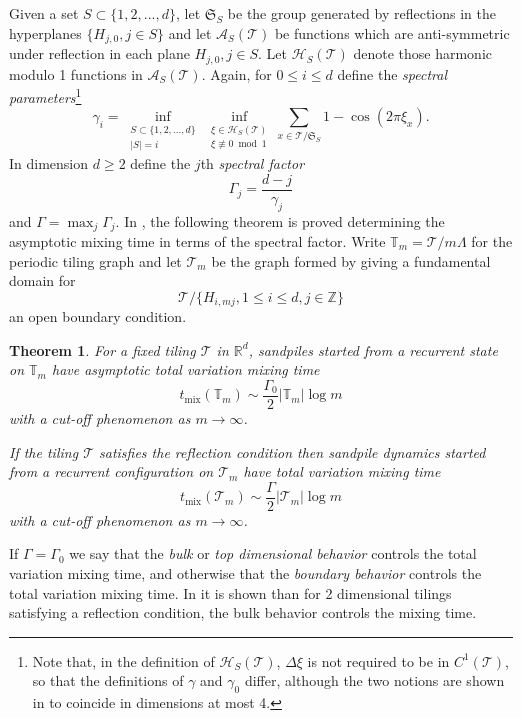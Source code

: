 \documentclass[a4paper, 12pt, notitlepage]{amsart}
\newcommand{\mix}{\operatorname{mix}}
\newcommand{\bR}{\mathbb{R}}
\newcommand{\bT}{\mathbb{T}}
\newcommand{\zed}{\mathbb{Z}}
\newcommand{\sA}{\mathscr{A}}
\newcommand{\sH}{\mathscr{H}}
\newcommand{\sT}{\mathscr{T}}
\newcommand{\fS}{{\mathfrak{S}}}
\newtheorem*{theorem*}{Theorem}
\theoremstyle{remark}
\begin{document}
Given a set $S \subset \{1, 2, ..., d\}$, let $\fS_S$ be the group generated by reflections in the hyperplanes $\{H_{j,0}, j \in S\}$ and let $\sA_S(\sT)$ be functions which are anti-symmetric under reflection in each plane $H_{j,0}, j \in S$.
Let $\sH_S(\sT)$ denote those harmonic modulo 1 functions in $\sA_S(\sT)$.  Again, for $0 \leq i \leq d$ define the \emph{spectral parameters}\footnote{Note that, in the definition of $\sH_S(\sT)$, $\Delta \xi$ is not required to be in $C^1(\sT)$, so that the definitions of $\gamma$ and $\gamma_0$ differ, although the two notions are shown in \cite{HS19} to coincide in dimensions at most 4.}
\begin{equation}
 \gamma_i =  \inf_{\substack{S \subset \{1, 2, ..., d\}\\ |S| = i}} \inf_{\substack{\xi \in \sH_S(\sT)\\ \xi \not \equiv 0 \bmod 1}} \sum_{x \in \sT/\fS_S} 1- \cos(2\pi \xi_x).
\end{equation}
In dimension $d \geq 2$ define the $j$th \emph{spectral factor} 
\begin{equation}
 \Gamma_j = \frac{d-j}{\gamma_j}
\end{equation}
and $\Gamma = \max_j \Gamma_j$.
In \cite{HS19}, the following theorem is proved determining the asymptotic mixing time in terms of the spectral factor. Write $\bT_m = \sT/m\Lambda$ for the periodic tiling graph and let $\sT_m$ be the graph formed by giving a fundamental domain for \[\sT/\{ H_{i,mj}, 1 \leq i \leq d, j \in \zed\}\] an open boundary condition.
\begin{theorem*}
For a fixed tiling $\sT$ in $\bR^d$, sandpiles started from a recurrent state on $\bT_m$ have asymptotic total variation mixing time
\begin{equation}
 t_{\mix}(\bT_m) \sim \frac{\Gamma_0}{2} |\bT_m| \log m
\end{equation}
with a cut-off phenomenon as $m \to \infty$.

If the tiling $\sT$ satisfies the reflection condition then sandpile dynamics started from a recurrent configuration on $\sT_m$ have total variation mixing time
\begin{equation}
 t_{\mix}(\sT_m) \sim \frac{\Gamma}{2} |\sT_m| \log m
\end{equation}
with a cut-off phenomenon as $m \to \infty$. 
\end{theorem*}
If $\Gamma = \Gamma_0$  we say that the \emph{bulk} or \emph{top dimensional behavior}  controls the total variation mixing time, and otherwise that the \emph{boundary behavior} controls the total variation mixing time.  In \cite{HS19} it is shown than for 2 dimensional tilings satisfying a reflection condition, the bulk behavior controls the mixing time.
\end{document}
